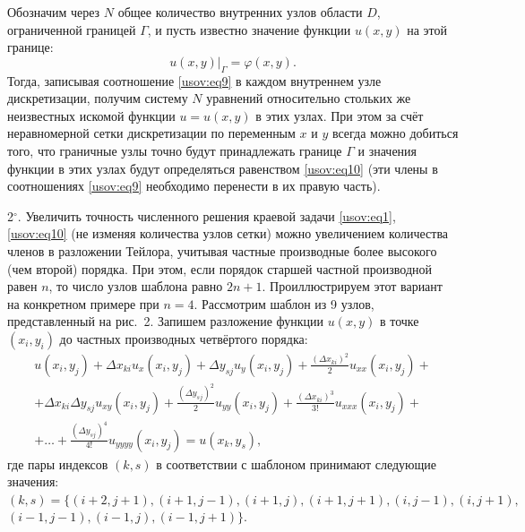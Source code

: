 Обозначим через $N$ общее количество внутренних узлов области
$D$, ограниченной границей $\Gamma$, и пусть известно значение
функции $u(x,y)$ на этой границе:
\begin{equation}
\label{usov:eq10} u(x,y) \big|_\Gamma =\varphi(x,y).
\end{equation}
Тогда, записывая соотношение \eqref{usov:eq9} в каждом внутреннем
узле дискретизации, получим систему $N$ уравнений относительно
стольких же неизвестных искомой функции $u=u(x,y)$ в этих узлах.
При этом за счёт неравномерной сетки дискретизации по переменным
$x$ и $y$ всегда можно добиться того, что граничные узлы точно
будут принадлежать границе $\Gamma$ и значения функции в этих
узлах будут определяться равенством \eqref{usov:eq10} (эти члены в
соотношениях \eqref{usov:eq9} необходимо перенести в их правую
часть).

\smallskip

2$^\circ$. Увеличить точность численного решения краевой задачи
\eqref{usov:eq1}, \eqref{usov:eq10} (не изменяя количества узлов
сетки) можно увеличением количества членов в разложении Тейлора,
учитывая частные производные более высокого (чем второй) порядка.
При этом, если порядок старшей частной производной равен $n$, то
число узлов шаблона равно $2n+1$. Проиллюстрируем этот вариант на
конкретном примере при $n=4$. Рассмотрим шаблон из 9 узлов,
представленный на рис.~2. Запишем разложение функции $u(x,y)$ в
точке $(x_i,y_i)$ до частных производных четвёртого порядка:
\begin{multline}
\label{usov:eq11} u(x_i,y_j) +\Delta x_{ki} u_x (x_i, y_j) +
\Delta y_{sj} u_{y} (x_i, y_j)+ \frac{(\Delta x_{ki})^2}2
u_{xx}(x_i, y_j) + \\
+\Delta x_{ki} \Delta y_{sj} u_{xy} (x_i,y_j)+ \frac{(\Delta
y_{sj})^2}2 u_{yy} (x_i, y_j)+ \frac{(\Delta x_{ki})^3}{3!}
u_{xxx} (x_i, y_j)+\\
+\ldots+ \frac{(\Delta y_{sj})^4}{4!} u_{yyyy} (x_i, y_j)=u(x_k,
y_s),
\end{multline}
где пары индексов $(k,s)$ в соответствии с шаблоном принимают
следующие значения:
$(k,s)=\{(i+2,j+1), (i+1,j-1), (i+1,j), (i+1,
j+1), (i,j-1),
(i,j+1),$ $ (i-1,j-1), (i-1,j), (i-1,j+1) \}.
$



